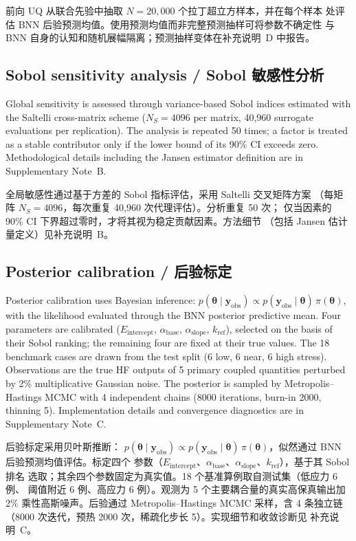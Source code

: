 \documentclass[11pt,a4paper]{article}
\newcommand{\Eint}{\ensuremath{E_{\mathrm{intercept}}}}
\newcommand{\abase}{\ensuremath{\alpha_{\mathrm{base}}}}
\newcommand{\aslope}{\ensuremath{\alpha_{\mathrm{slope}}}}
\newcommand{\kref}{\ensuremath{k_{\mathrm{ref}}}}
\begin{document}
前向 UQ 从联合先验中抽取 $N = 20{,}000$ 个拉丁超立方样本，并在每个样本
处评估 BNN 后验预测均值。使用预测均值而非完整预测抽样可将参数不确定性
与 BNN 自身的认知和随机展幅隔离；预测抽样变体在补充说明~D 中报告。

\subsection{Sobol sensitivity analysis / Sobol 敏感性分析}

Global sensitivity is assessed through variance-based Sobol indices
estimated with the Saltelli cross-matrix scheme ($N_S = 4096$ per
matrix, 40,960 surrogate evaluations per replication). The analysis is
repeated 50 times; a factor is treated as a stable contributor only if
the lower bound of its 90\% CI exceeds zero. Methodological details
including the Jansen estimator definition are in Supplementary Note~B.

全局敏感性通过基于方差的 Sobol 指标评估，采用 Saltelli 交叉矩阵方案
（每矩阵 $N_S = 4096$，每次重复 40,960 次代理评估）。分析重复 50 次；
仅当因素的 90\% CI 下界超过零时，才将其视为稳定贡献因素。方法细节
（包括 Jansen 估计量定义）见补充说明~B。

\subsection{Posterior calibration / 后验标定}

Posterior calibration uses Bayesian inference:
$p(\boldsymbol{\theta} \mid \mathbf{y}_{\mathrm{obs}}) \propto
p(\mathbf{y}_{\mathrm{obs}} \mid \boldsymbol{\theta})\,
\pi(\boldsymbol{\theta})$, with the likelihood evaluated through the BNN
posterior predictive mean. Four parameters are calibrated (\Eint{},
\abase{}, \aslope{}, \kref{}), selected on the basis of their Sobol
ranking; the remaining four are fixed at their true values. The 18
benchmark cases are drawn from the test split (6 low, 6 near, 6 high
stress). Observations are the true HF outputs of 5 primary coupled
quantities perturbed by 2\% multiplicative Gaussian noise. The posterior
is sampled by Metropolis--Hastings MCMC with 4 independent chains (8000
iterations, burn-in 2000, thinning 5). Implementation details and
convergence diagnostics are in Supplementary Note~C.

后验标定采用贝叶斯推断：
$p(\boldsymbol{\theta} \mid \mathbf{y}_{\mathrm{obs}}) \propto
p(\mathbf{y}_{\mathrm{obs}} \mid \boldsymbol{\theta})\,
\pi(\boldsymbol{\theta})$，似然通过 BNN 后验预测均值评估。标定四个
参数（\Eint{}、\abase{}、\aslope{}、\kref{}），基于其 Sobol 排名
选取；其余四个参数固定为真实值。18 个基准算例取自测试集（低应力 6 例、
阈值附近 6 例、高应力 6 例）。观测为 5 个主要耦合量的真实高保真输出加
2\% 乘性高斯噪声。后验通过 Metropolis--Hastings MCMC 采样，含 4 条独立链
（8000 次迭代，预热 2000 次，稀疏化步长 5）。实现细节和收敛诊断见
补充说明~C。
\end{document}
